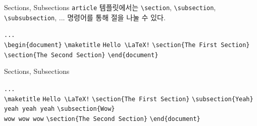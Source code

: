 \documentclass[12pt]{gshs_lecture}
\newenvironment{codeblock}[1]{
	\begin{block}{#1}
		\setstretch{1.0}
		\begin{small}
}{
		\end{small}
	\end{block}
}
\begin{document}
\begin{frame}[t]{Sections, Subsections}
	\texttt{article} 템플릿에서는 \texttt{\textbackslash section}, \texttt{\textbackslash subsection}, \texttt{\textbackslash subsubsection}, ... 명령어를 통해 절을 나눌 수 있다.
	\vskip 1pc
	\begin{codeblock}{}
		\texttt{...}\\
		\texttt{\textbackslash begin\{document\}}
		\vskip 1pc
		\texttt{\textbackslash maketitle}
		\vskip 1pc
		\texttt{Hello \textbackslash LaTeX!}
		\vskip 1pc
		{\color{red}
		\texttt{\textbackslash section\{The First Section\}}
		\vskip 1pc
		\texttt{\textbackslash section\{The Second Section\}}
		}
		\vskip 1pc
		\texttt{\textbackslash end\{document\}}
	\end{codeblock}
\end{frame}

\begin{frame}[t]{Sections, Subsections}
\begin{codeblock}{}
	\texttt{...}\\
	\texttt{\textbackslash maketitle}
	\vskip 1pc
	\texttt{Hello \textbackslash LaTeX!}
	\vskip 1pc
	\texttt{\textbackslash section\{The First Section\}}
	\vskip 1pc
	{\color{red}
		\texttt{\textbackslash subsection\{Yeah\}} \\
		\texttt{yeah yeah yeah}
		\vskip 1pc
		\texttt{\textbackslash subsection\{Wow\}} \\
		\texttt{wow wow wow}
	}
	\vskip 1pc
	\texttt{\textbackslash section\{The Second Section\}}
	\vskip 1pc
	\texttt{\textbackslash end\{document\}}
\end{codeblock}
\end{frame}
\end{document}
